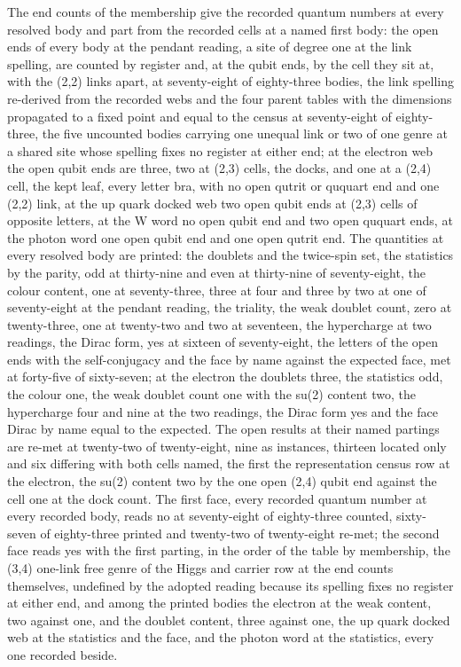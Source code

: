\begin{chwall}\label{box:IV-11-quantum-numbers-of-every-body-as-the-end-counts-of-its-membership:1}
The end counts of the membership give the recorded quantum numbers at every resolved body and part from the recorded cells at a named first body: the open ends of every body at the pendant reading, a site of degree one at the link spelling, are counted by register and, at the qubit ends, by the cell they sit at, with the (2,2) links apart, at seventy-eight of eighty-three bodies, the link spelling re-derived from the recorded webs and the four parent tables with the dimensions propagated to a fixed point and equal to the census at seventy-eight of eighty-three, the five uncounted bodies carrying one unequal link or two of one genre at a shared site whose spelling fixes no register at either end; at the electron web the open qubit ends are three, two at (2,3) cells, the docks, and one at a (2,4) cell, the kept leaf, every letter bra, with no open qutrit or ququart end and one (2,2) link, at the up quark docked web two open qubit ends at (2,3) cells of opposite letters, at the W word no open qubit end and two open ququart ends, at the photon word one open qubit end and one open qutrit end. The quantities at every resolved body are printed: the doublets and the twice-spin set, the statistics by the parity, odd at thirty-nine and even at thirty-nine of seventy-eight, the colour content, one at seventy-three, three at four and three by two at one of seventy-eight at the pendant reading, the triality, the weak doublet count, zero at twenty-three, one at twenty-two and two at seventeen, the hypercharge at two readings, the Dirac form, yes at sixteen of seventy-eight, the letters of the open ends with the self-conjugacy and the face by name against the expected face, met at forty-five of sixty-seven; at the electron the doublets three, the statistics odd, the colour one, the weak doublet count one with the su(2) content two, the hypercharge four and nine at the two readings, the Dirac form yes and the face Dirac by name equal to the expected. The open results at their named partings are re-met at twenty-two of twenty-eight, nine as instances, thirteen located only and six differing with both cells named, the first the representation census row at the electron, the su(2) content two by the one open (2,4) qubit end against the cell one at the dock count. The first face, every recorded quantum number at every recorded body, reads no at seventy-eight of eighty-three counted, sixty-seven of eighty-three printed and twenty-two of twenty-eight re-met; the second face reads yes with the first parting, in the order of the table by membership, the (3,4) one-link free genre of the Higgs and carrier row at the end counts themselves, undefined by the adopted reading because its spelling fixes no register at either end, and among the printed bodies the electron at the weak content, two against one, and the doublet content, three against one, the up quark docked web at the statistics and the face, and the photon word at the statistics, every one recorded beside.

\end{chwall}
